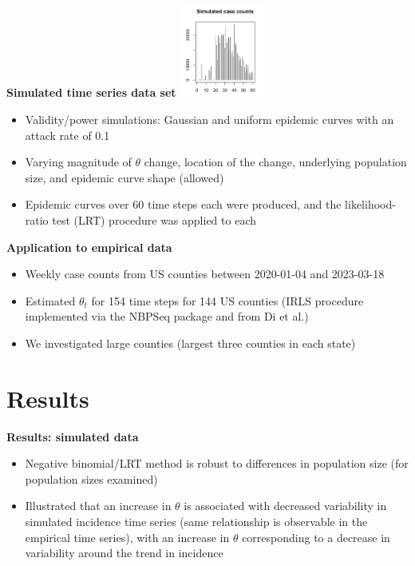 \documentclass{beamer}
\begin{document}
\begin{frame}{\textbf{Simulated time series data set}}
\includegraphics[height=3cm]{sim}
\begin{itemize}[<+-| alert@+>]
	\item Validity/power simulations: Gaussian and uniform epidemic curves with an attack rate of 0.1 
 	\item Varying magnitude of \begin{math}\theta\end{math} change, location of the change, underlying population size, and epidemic curve shape (allowed)
	\item Epidemic curves over 60 time steps each were produced, and the likelihood-ratio test (LRT) procedure was applied to each
\end{itemize}
\end{frame}

\begin{frame}{\textbf{Application to empirical data}}
	\begin{itemize}[<+-| alert@+>]
            \item Weekly case counts from US counties between 2020-01-04 and 2023-03-18
		\item Estimated \begin{math}\theta_t\end{math} for 154 time steps for 144 US counties (IRLS procedure implemented via the NBPSeq package\cite{NBPSeq} and from Di et al.\cite{yanming_nbp_2011}) 
		\item We investigated large counties (largest three counties in each state)
	\end{itemize}
\end{frame}

\section{Results}
\begin{frame}{\textbf{Results: simulated data}}
	\begin{itemize}[<+-| alert@+>]
		\item Negative binomial/LRT method is robust to differences in population size (for population sizes examined)
		\item Illustrated that an increase in \begin{math}\theta\end{math} is associated with decreased variability in simulated incidence time series  (same relationship is observable in the empirical time series), with an increase in \begin{math}\theta\end{math} corresponding to a decrease in variability around the trend in incidence
	\end{itemize}
\end{frame}
\end{document}
